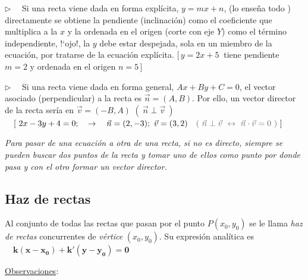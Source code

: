 \begin{cuadro-naranja}
\vspace{4mm} $\triangleright \quad $ Si una recta viene dada en forma explícita,  $y=mx+n$, \textcolor{gris}{(lo enseña todo \smiley )} directamente se obtiene la pendiente (inclinación) como el coeficiente que multiplica a la $x$ y la ordenada en el origen (corte con eje $Y$) como el término independiente, !`ojo!, la $y$ debe estar despejada, sola en un miembro de la ecuación, por tratarse  de la ecuación explícita. $[\, y=2x+5 \ $ tiene pendiente $m=2$ y ordenada en el origen $n=5 \, ]$


\vspace{4mm} $\triangleright \quad $ Si una recta viene dada en forma general, $Ax+By+C=0$, el vector asociado (perpendicular) a la recta es $\vec n=(A,B)$. Por ello, un vector director de la recta sería en $\vec v=(-B,A)$ \textcolor{gris}{$ (\ \vec n \perp \vec v \ )$} $\quad [ \ 2x-3y+4=0 ;\quad \to \quad  \vec n=(2,-3);\ \vec v=(3,2) \quad \textcolor{gris}{ (\ \vec n \perp \vec v \ \leftrightarrow \ \vec n \cdot \vec v=0 \ ) } \  ]$

\vspace{6mm} \emph{Para pasar de una ecuación a otra de una recta, si no es directo, siempre se pueden buscar dos puntos de la recta y tomar uno de ellos como punto por donde pasa y con el otro formar un vector director.}
\end{cuadro-naranja}



\vspace{5mm}
\subsection{Haz de rectas}
\vspace{0.5cm}


\begin{definition}

Al conjunto de todas las rectas que pasan por el punto $P(x_0,y_0)$ se le llama \emph{haz de rectas} concurrentes de \emph{vértice} $(x_0,y_0)$. Su expresión analítica es $\quad \boldsymbol{k(x-x_0)+k'(y-y_0)=0}$
	
\end{definition}

\underline{Observaciones}:

